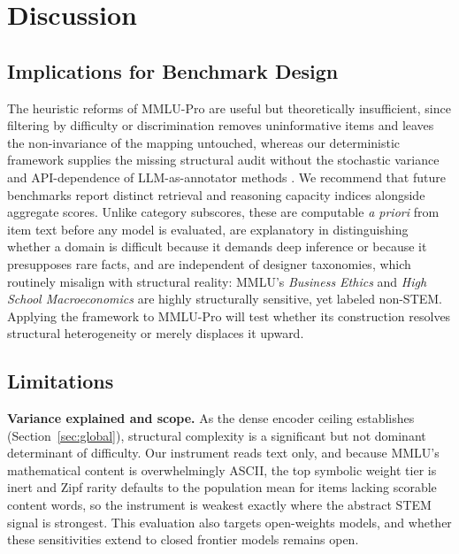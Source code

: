 \section{Discussion}\label{discussion-1}

\subsection{Implications for Benchmark Design}\label{implications-for-benchmark-design}

The heuristic reforms of MMLU-Pro \citep{wang2024} are useful but theoretically insufficient, since filtering by difficulty or discrimination removes uninformative items and leaves the non-invariance of the mapping untouched, whereas our deterministic framework supplies the missing structural audit without the stochastic variance and API-dependence of LLM-as-annotator methods \citep{gilardi2023}. We recommend that future benchmarks report distinct retrieval and reasoning capacity indices alongside aggregate scores. Unlike category subscores, these are computable \emph{a priori} from item text before any model is evaluated, are explanatory in distinguishing whether a domain is difficult because it demands deep inference or because it presupposes rare facts, and are independent of designer taxonomies, which routinely misalign with structural reality: MMLU's \emph{Business Ethics} and \emph{High School Macroeconomics} are highly structurally sensitive, yet labeled non-STEM. Applying the framework to MMLU-Pro will test whether its construction resolves structural heterogeneity or merely displaces it upward.

\subsection{Limitations}\label{limitations}

\textbf{Variance explained and scope.} As the dense encoder ceiling establishes (Section~\ref{sec:global}), structural complexity is a significant but not dominant determinant of difficulty. Our instrument reads text only, and because MMLU's mathematical content is overwhelmingly ASCII, the top symbolic weight tier is inert and Zipf rarity defaults to the population mean for items lacking scorable content words, so the instrument is weakest exactly where the abstract STEM signal is strongest. This evaluation also targets open-weights models, and whether these sensitivities extend to closed frontier models remains open.

